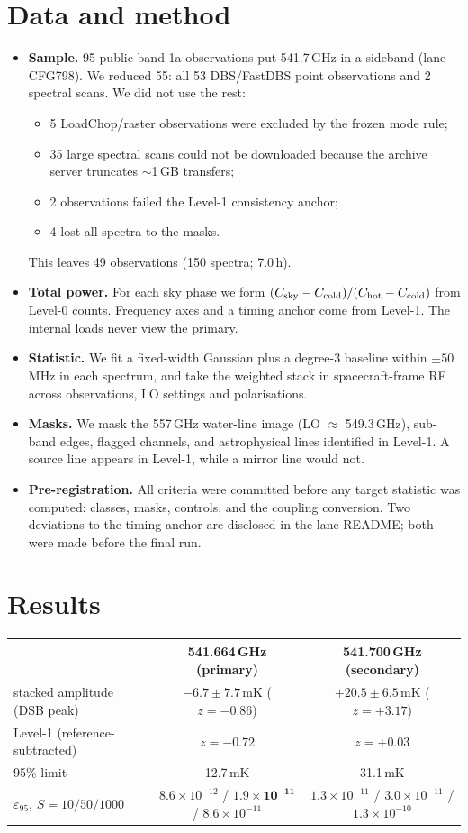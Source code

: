 \documentclass[10pt]{article}
\begin{document}
\section{Data and method}
\begin{itemize}
\item \textbf{Sample.} 95 public band-1a observations put 541.7\,GHz in a sideband (lane CFG798). We reduced 55: all 53 DBS/FastDBS point observations and 2 spectral scans. We did not use the rest:
  \begin{itemize}
  \item 5 LoadChop/raster observations were excluded by the frozen mode rule;
  \item 35 large spectral scans could not be downloaded because the archive server truncates $\sim$1\,GB transfers;
  \item 2 observations failed the Level-1 consistency anchor;
  \item 4 lost all spectra to the masks.
  \end{itemize}
  This leaves 49 observations (150 spectra; 7.0\,h).
\item \textbf{Total power.} For each sky phase we form $(C_{\rm sky}-C_{\rm cold})/(C_{\rm hot}-C_{\rm cold})$ from Level-0 counts. Frequency axes and a timing anchor come from Level-1. The internal loads never view the primary.
\item \textbf{Statistic.} We fit a fixed-width Gaussian plus a degree-3 baseline within $\pm50$\,MHz in each spectrum, and take the weighted stack in spacecraft-frame RF across observations, LO settings and polarisations.
\item \textbf{Masks.} We mask the 557\,GHz water-line image (LO $\approx$ 549.3\,GHz), sub-band edges, flagged channels, and astrophysical lines identified in Level-1. A source line appears in Level-1, while a mirror line would not.
\item \textbf{Pre-registration.} All criteria were committed before any target statistic was computed: classes, masks, controls, and the coupling conversion. Two deviations to the timing anchor are disclosed in the lane README; both were made before the final run.
\end{itemize}

\section{Results}
\begin{center}
\begin{tabular}{lcc}
\toprule
 & 541.664\,GHz (primary) & 541.700\,GHz (secondary)\\
\midrule
stacked amplitude (DSB peak) & $-6.7\pm7.7$\,mK ($z=-0.86$) & $+20.5\pm6.5$\,mK ($z=+3.17$)\\
Level-1 (reference-subtracted) & $z=-0.72$ & $z=+0.03$\\
95\% limit & 12.7\,mK & 31.1\,mK\\
$\varepsilon_{95}$, $S=10/50/1000$ & $8.6\times10^{-12}$ / $\mathbf{1.9\times10^{-11}}$ / $8.6\times10^{-11}$ & $1.3\times10^{-11}$ / $3.0\times10^{-11}$ / $1.3\times10^{-10}$\\
\bottomrule
\end{tabular}
\end{center}
\end{document}
